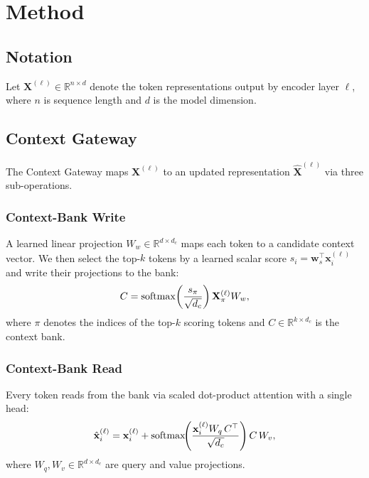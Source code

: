 \section{Method}
\label{sec:method}

\subsection{Notation}

Let $\mathbf{X}^{(\ell)} \in \mathbb{R}^{n \times d}$ denote the token
representations output by encoder layer $\ell$, where $n$ is sequence length
and $d$ is the model dimension.

\subsection{Context Gateway}

The Context Gateway maps $\mathbf{X}^{(\ell)}$ to an updated representation
$\hat{\mathbf{X}}^{(\ell)}$ via three sub-operations.

\subsubsection{Context-Bank Write}
A learned linear projection $W_w \in \mathbb{R}^{d \times d_c}$ maps each token
to a candidate context vector. We then select the top-$k$ tokens by a learned
scalar score $s_i = \mathbf{w}_s^\top \mathbf{x}_i^{(\ell)}$ and write their
projections to the bank:
\begin{equation}
  C = \operatorname{softmax}\!\left(\frac{s_{\pi}}{\sqrt{d_c}}\right)
      \mathbf{X}^{(\ell)}_\pi W_w,
  \label{eq:write}
\end{equation}
where $\pi$ denotes the indices of the top-$k$ scoring tokens and
$C \in \mathbb{R}^{k \times d_c}$ is the context bank.

\subsubsection{Context-Bank Read}
Every token reads from the bank via scaled dot-product attention with a single
head:
\begin{equation}
  \hat{\mathbf{x}}_i^{(\ell)} =
    \mathbf{x}_i^{(\ell)} +
    \operatorname{softmax}\!\!\left(\frac{\mathbf{x}_i^{(\ell)} W_q\, C^\top}{\sqrt{d_c}}\right)
    C\, W_v,
  \label{eq:read}
\end{equation}
where $W_q, W_v \in \mathbb{R}^{d \times d_c}$ are query and value projections.

